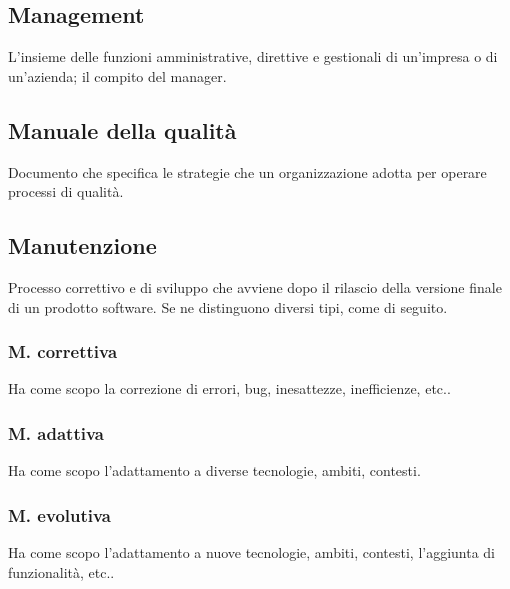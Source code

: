 	
	\subsection{Management}
	\label{sec:management}
	L'insieme delle funzioni amministrative, direttive e gestionali di un'impresa o di un'azienda; il compito del manager.
	
	\subsection{Manuale della qualità}
	\label{sec:manualequalita}
	Documento che specifica le strategie che un organizzazione adotta per operare processi di qualità.
	
	
	\subsection{Manutenzione}
	\label{sec:manutenzione}
	Processo correttivo e di sviluppo che avviene dopo il rilascio della versione finale di un prodotto software. Se ne distinguono diversi tipi, come di seguito.
		
		\subsubsection{M. correttiva}
		Ha come scopo la correzione di errori, bug, inesattezze, inefficienze, etc..
		
		\subsubsection{M. adattiva}
		Ha come scopo l'adattamento a diverse tecnologie, ambiti, contesti.
		
		\subsubsection{M. evolutiva}
		Ha come scopo l'adattamento a nuove tecnologie, ambiti, contesti, l'aggiunta di funzionalità, etc..

